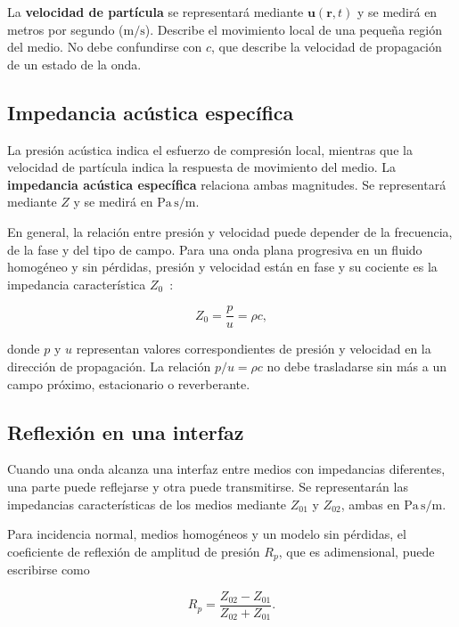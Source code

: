 La \textbf{velocidad de partícula} se representará mediante
\(\mathbf u(\mathbf r,t)\) y se medirá en metros por segundo
(\(\text{m}/\text{s}\)). Describe el movimiento local de una pequeña región
del medio. No debe confundirse con \(c\), que describe la velocidad de
propagación de un estado de la onda.

\subsection{Impedancia acústica específica}
\label{sec:u4-impedancia}

La presión acústica indica el esfuerzo de compresión local, mientras que la
velocidad de partícula indica la respuesta de movimiento del medio. La
\textbf{impedancia acústica específica} relaciona ambas magnitudes. Se
representará mediante \(Z\) y se medirá en
\(\text{Pa}\,\text{s}/\text{m}\).

En general, la relación entre presión y velocidad puede depender de la
frecuencia, de la fase y del tipo de campo. Para una onda plana
progresiva en un fluido homogéneo y sin pérdidas, presión y velocidad están en
fase y su cociente es la impedancia característica \(Z_0\)~\cite{xiangBlauert2021}:

\begin{equation}
    Z_0=\frac{p}{u}=\rho c,
    \label{eq:u4-impedancia-caracteristica}
\end{equation}

donde \(p\) y \(u\) representan valores correspondientes de presión y
velocidad en la dirección de propagación. La relación
\(p/u=\rho c\) no debe trasladarse sin más a un campo próximo, estacionario o
reverberante.

\subsection{Reflexión en una interfaz}
\label{sec:u4-reflexion}

Cuando una onda alcanza una interfaz entre medios con impedancias diferentes,
una parte puede reflejarse y otra puede transmitirse. Se representarán las
impedancias características de los medios mediante \(Z_{01}\) y \(Z_{02}\),
ambas en \(\text{Pa}\,\text{s}/\text{m}\).

Para incidencia normal, medios homogéneos y un modelo sin pérdidas, el
coeficiente de reflexión de amplitud de presión \(R_p\), que es adimensional,
puede escribirse como~\cite{xiangBlauert2021}

\begin{equation}
    R_p=\frac{Z_{02}-Z_{01}}{Z_{02}+Z_{01}}.
    \label{eq:u4-reflexion-presion}
\end{equation}

